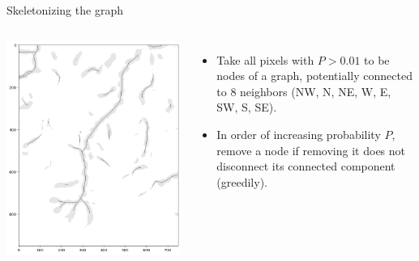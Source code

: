 \documentclass[aspectratio=169]{beamer}
\begin{document}
\begin{frame}{Skeletonizing the graph}
\vspace{0.35 cm}
\begin{columns}
\includegraphics[width=\linewidth]{img/skeletonization.png}

\begin{itemize}\setlength{\itemsep}{0.5 cm}
\item Take all pixels with $P > 0.01$ to be nodes of a graph, potentially connected to 8 neighbors (NW, N, NE, W, E, SW, S, SE).
\item In order of increasing probability $P$, remove a node if removing it does not disconnect its connected component (greedily).
\end{itemize}
\end{columns}
\end{frame}
\end{document}
